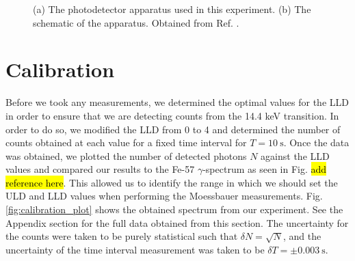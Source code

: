 \documentclass[a4paper]{report}
\numberwithin{equation}{section}
\begin{document}
\begin{figure}[htb!]
	\centering
	\quad
	\centering
	\caption{(a) The photodetector apparatus used in this experiment. (b) The schematic of the apparatus. Obtained from 
			Ref. \cite{k2212016}.}
	\label{fig:apparatus_raw}
\end{figure}


\chapter{Calibration} \label{sec:calibration}

Before we took any measurements, we determined the optimal values for the LLD in order to ensure that we are 
detecting counts from the 14.4 keV transition. In order to do so, we modified the LLD from 0 to 4 and determined the number 
of counts obtained at each value for a fixed time interval for $T = \SI{10}{\second}$. Once the data was obtained, 
we plotted the number of detected photons $N$ against the LLD values and compared our results to the Fe-57 $\gamma$-spectrum as seen in Fig. \hl{add reference here}.
This allowed us to identify the range in which we should set the ULD and LLD values when performing the Moessbauer measurements. 
 Fig. \ref{fig:calibration_plot} shows the obtained spectrum from our experiment. See the Appendix section for the full data obtained from this 
 section. The uncertainty for the counts were taken to be purely statistical such that $\delta N = \sqrt{N}$, and the uncertainty 
 of the time interval measurement was taken to be $\delta T = \pm \SI{0.003}{\second}$. \par
\end{document}
